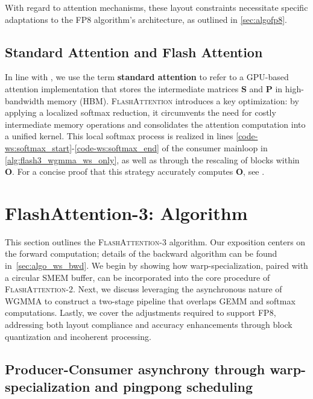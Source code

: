 With regard to attention mechanisms, these layout constraints necessitate specific adaptations to the FP8 algorithm's architecture, as outlined in \cref{sec:algofp8}.

\subsection{Standard Attention and Flash Attention} In line with \citet{dao2022flashattention}, we use the term \textbf{standard attention} to refer to a GPU-based attention implementation that stores the intermediate matrices $\mathbf{S}$ and $\mathbf{P}$ in high-bandwidth memory (HBM). \textsc{FlashAttention} introduces a key optimization: by applying a localized softmax reduction, it circumvents the need for costly intermediate memory operations and consolidates the attention computation into a unified kernel. This local softmax process is realized in lines \ref{code-ws:softmax_start}-\ref{code-ws:softmax_end} of the consumer mainloop in \cref{alg:flash3_wgmma_ws_only}, as well as through the rescaling of blocks within $\mathbf{O}$. For a concise proof that this strategy accurately computes $\mathbf{O}$, see \cite[\S 2.3.1]{dao2023flashattention2}.

\section{FlashAttention-3: Algorithm}
\label{sec:algo}

This section outlines the \textsc{FlashAttention-3} algorithm. Our exposition centers on the forward computation; details of the backward algorithm can be found in~\cref{sec:algo_ws_bwd}. We begin by showing how warp-specialization, paired with a circular SMEM buffer, can be incorporated into the core procedure of \textsc{FlashAttention-2}. Next, we discuss leveraging the asynchronous nature of WGMMA to construct a two-stage pipeline that overlaps GEMM and softmax computations. Lastly, we cover the adjustments required to support FP8, addressing both layout compliance and accuracy enhancements through block quantization and incoherent processing.

\subsection{Producer-Consumer asynchrony through warp-specialization and pingpong scheduling}
\label{sec:algo_ws}

